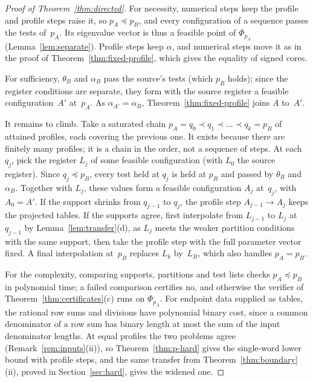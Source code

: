 \begin{proof}[Proof of Theorem~\ref{thm:directed}]
For necessity, numerical steps keep the profile and profile steps raise
it, so $p_A\preceq p_B$, and every configuration of a sequence passes the
tests of~$p_A$. Its eigenvalue vector is thus a feasible point of
$\Phi_{p_A}$ (Lemma~\ref{lem:separate}). Profile steps keep $\alpha$, and
numerical steps move it as in the proof of Theorem~\ref{thm:fixed-profile},
which gives the equality of signed cores.

For sufficiency, $\theta_B$ and $\alpha_B$ pass the source's tests (which
$p_B$ holds); since the register conditions are separate, they form with
the source register a feasible configuration~$A'$ at~$p_A$. As
$\alpha_{A'}=\alpha_B$, Theorem~\ref{thm:fixed-profile} joins $A$ to~$A'$.

It remains to climb. Take a saturated chain
$p_A=q_0\prec q_1\prec\dots\prec q_k=p_B$ of attained profiles, each
covering the previous one. It exists because there are finitely many
profiles; it is a chain in the order, not a sequence of steps. At each
$q_j$, pick the register $L_j$ of some feasible configuration (with $L_0$
the source register). Since $q_j\preceq p_B$, every test held at $q_j$ is held
at $p_B$ and passed by $\theta_B$ and $\alpha_B$. Together with $L_j$,
these values form a feasible configuration $A_j$ at~$q_j$, with $A_0=A'$.
If the support shrinks from $q_{j-1}$ to $q_j$, the profile step
$A_{j-1}\to A_j$ keeps the projected tables. If the supports agree, first
interpolate from $L_{j-1}$ to $L_j$ at $q_{j-1}$ by
Lemma~\ref{lem:transfer}(d), as $L_j$ meets the weaker partition
conditions with the same support, then take the profile step with the full
parameter vector fixed. A final interpolation at~$p_B$ replaces $L_k$
by~$L_B$, which also handles $p_A=p_B$.

For the complexity, comparing supports, partitions and test lists checks
$p_A\preceq p_B$ in polynomial time; a failed comparison certifies no, and
otherwise the verifier of Theorem~\ref{thm:certificates}(c) runs on
$\Phi_{p_A}$. For endpoint data supplied as tables, the rational row sums
and divisions have polynomial binary cost, since a common denominator of a
row sum has binary length at most the sum of the input denominator
lengths. At equal profiles the two problems agree
(Remark~\ref{rem:inputs}(ii)), so Theorem~\ref{thm:p-hard} gives the
single-word lower bound with profile steps, and the same transfer from
Theorem~\ref{thm:boundary}(ii), proved in Section~\ref{sec:hard}, gives
the widened one.
\end{proof}

